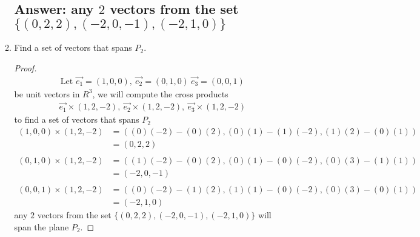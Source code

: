 \documentclass[12pt]{article}
\begin{document}
\begin{enumerate}
\begin{enumerate}
                            \subsection{Answer: any $2$ vectors from the set $\{(0, 2, 2) , (-2, 0, -1), (-2, 1, 0)\}$}
                      \item Find a set of vectors that spans $P_2$.
                            \begin{proof}
                                    \begin{align*}
                                            \textrm{Let }\vec{e_1} = (1, 0, 0),\ \vec{e_2} = (0, 1, 0)\ \vec{e_3} = (0, 0, 1)
                                    \end{align*}
                                    be unit vectors in $R^3$, we will compute the cross products
                                    \begin{align*}
                                            \vec{e_1} \times (1, 2, -2),\ \vec{e_2} \times (1, 2, -2),\ \vec{e_3} \times (1, 2, -2)
                                    \end{align*}
                                    to find a set of vectors that spans $P_2$
                                    \begin{align*}
                                            (1,0,0) \times (1, 2, -2) & = ( (0)(-2) - (0)(2), (0)(1)-(1)(-2), (1)(2)-(0)(1) ) \\
                                                                      & = (0, 2, 2)                                           \\\\
                                            (0,1,0) \times (1, 2, -2) & = ( (1)(-2) - (0)(2), (0)(1)-(0)(-2), (0)(3)-(1)(1) ) \\
                                                                      & = (-2, 0, -1)                                         \\\\
                                            (0,0,1) \times (1, 2, -2) & = ( (0)(-2) - (1)(2), (1)(1)-(0)(-2), (0)(3)-(0)(1) ) \\
                                                                      & = (-2, 1, 0)
                                    \end{align*}
                                    any $2$ vectors from the set $\{(0, 2, 2) , (-2, 0, -1), (-2, 1, 0)\}$ will span the plane $P_2$.
                            \end{proof}
                            \pagebreak

\end{enumerate}
\end{enumerate}
\end{document}
